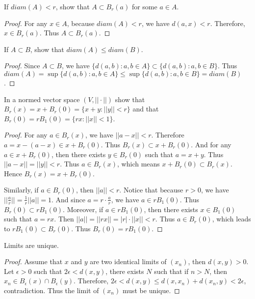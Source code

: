 \documentclass[12pt, a4paper]{article}
\theoremstyle{plain}
\begin{document}
\begin{exercise}{28}
If $diam(A)<r$, show that $A\subset B_r(a)$ for some $a\in A$.
\end{exercise}
	\begin{proof}
	For any $x\in A$, because $diam(A)<r$, we have $d(a,x)<r$. Therefore, $x\in B_r(a)$. Thus $A\subset B_r(a)$.
	\end{proof}
	
\begin{exercise}{30}
If $A\subset B$, show that $diam(A)\leq diam(B)$.
\end{exercise}
	\begin{proof}


	Since $A\subset B$, we have $\{d(a,b):a,b\in A\}\subset \{d(a,b):a,b\in B\}$. Thus $diam(A) = \sup\{d(a,b):a,b\in A\}\leq \sup\{d(a,b):a,b\in B\} = diam(B)$.
	\end{proof}
	
\begin{exercise}{32}
In a normed vector space $(V,||\cdot ||)$ show that $B_r(x)=x+B_r(0)=\{x+y:||y||<r\}$ and that $B_r(0)=rB_1(0)=\{rx:||x||<1\}$.
\end{exercise}
	\begin{proof}
	For any $a\in B_r(x)$, we have $||a-x||<r$. Therefore $a=x-(a-x)\in x+B_r(0)$. Thus $B_r(x)\subset x+B_r(0)$. And for any $a\in x+B_r(0)$, then there exists $y\in B_r(0)$ such that $a=x+y$. Thus $||a-x||=||y||<r$. Thus $a\in B_r(x)$, which means $x+B_r(0)\subset B_r(x)$. Hence $B_r(x)=x+B_r(0)$.
	
	Similarly, if $a\in B_r(0)$, then $||a||<r$. Notice that because $r>0$, we have $||\frac{a}{r}||=\frac{1}{r}||a||=1$. And since $a=r\cdot \frac{a}{r}$, we have $a\in rB_1(0)$. Thus $B_r(0)\subset rB_1(0)$. Moreover, if $a\in rB_1(0)$, then there exists $x\in B_1(0)$ such that $a=rx$. Then $||a||=||rx||=|r|\cdot ||x||<r$. Thus $a\in B_r(0)$, which leads to $rB_1(0)\subset B_r(0)$. Thus $B_r(0)=rB_1(0)$.
	\end{proof}

\begin{exercise}{33}
Limits are unique.
\end{exercise}
	\begin{proof}
	Assume that $x$ and $y$ are two identical limits of $(x_n)$, then $d(x,y)>0$. Let $\epsilon>0$ such that $2\epsilon<d(x,y)$, there exists $N$ such that if $n>N$, then $x_n\in B_\epsilon(x)\cap B_\epsilon (y)$. Therefore, $2\epsilon<d(x,y)\leq d(x,x_n)+d(x_n,y)<2\epsilon$, contradiction. Thus the limit of $(x_n)$ must be unique.
	\end{proof}
\end{document}
